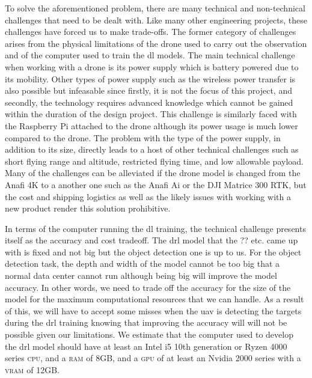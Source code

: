\documentclass[../main.tex]{subfiles}
\begin{document}
To solve the aforementioned problem, 
there are many technical and non-technical challenges
that need to be dealt with.
Like many other engineering projects,
these challenges have forced us to make trade-offs.
The former category of challenges arises 
from the physical limitations of the drone used to
carry out the observation
and of the computer used to train the \gls{dl} models.
The main technical challenge when working with a drone
is its power supply which is battery powered due to its mobility. 
Other types of power supply such as the wireless power transfer
is also possible but infeasable since firstly, it is not the
focus of this project, and secondly, the technology requires 
advanced knowledge which cannot be gained within the duration 
of the design project.
This challenge is similarly faced with the Raspberry Pi attached
to the drone although its power usage is much lower compared to the drone.
The problem with the type of the power supply, in addition to its size, 
directly leads to a host of other technical challenges
such as short flying range and altitude, restricted flying time,
and low allowable payload.
Many of the challenges can be alleviated if the drone model is changed
from the Anafi 4K to a another one such as 
the Anafi Ai or the DJI Matrice 300 RTK,
but the cost and shipping logistics as well as
the likely issues with working with a new product
render this solution prohibitive.

In terms of the computer running the \gls{dl} training,
the technical challenge presents itself as 
the accuracy and cost tradeoff.
The drl model that the ?? etc. came up with 
is fixed and not big
but the object detection one is up to us.
For the object detection task, 
the depth and width of the model cannot be too big that
a normal data center cannot run although 
being big will improve
the model accuracy. In other words, we need to trade off
the accuracy for the size of the model 
for the maximum computational resources that we can handle. 
As a result of this, we will have to accept some misses
when the \gls{uav} is detecting the targets during the 
\gls{drl} training knowing that improving the accuracy will 
will not be possible given our limitations.
We estimate that the computer used to develop the \gls{drl} model
should have at least an Intel i5 10th generation or
Ryzen 4000 series \textsc{cpu}, and a \textsc{ram} of 8GB, 
and a \textsc{gpu} of at least an Nvidia 2000 series
with a \textsc{vram} of 12GB.
\end{document}

